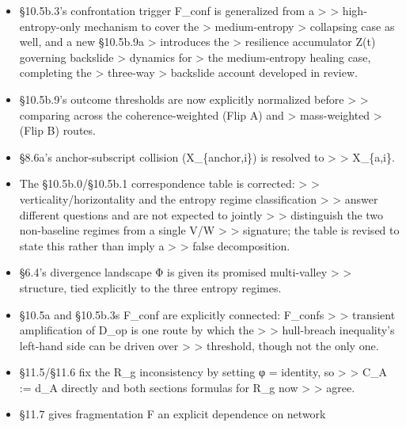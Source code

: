 \documentclass[
]{article}
\begin{document}
\begin{itemize}
  contradicting \textgreater{} \textgreater{} §10.5b.8's explicit
  coherence/dissipation account for that same \textgreater{}
  \textgreater{} regime. It now uses the coherence account consistently.
\item
  §10.5b.3's confrontation trigger F\_conf is generalized from a
  \textgreater{} \textgreater{} high-entropy-only mechanism to cover the
  \textgreater{} medium-entropy \textgreater{} collapsing case as well,
  and a new §10.5b.9a \textgreater{} introduces the \textgreater{}
  resilience accumulator Z(t) governing backslide \textgreater{}
  dynamics for \textgreater{} the medium-entropy healing case,
  completing the \textgreater{} three-way \textgreater{} backslide
  account developed in review.
\item
  §10.5b.9's outcome thresholds are now explicitly normalized before
  \textgreater{} \textgreater{} comparing across the coherence-weighted
  (Flip A) and \textgreater{} mass-weighted \textgreater{} (Flip B)
  routes.
\item
  §8.6a's anchor-subscript collision (X\_\{anchor,i\}) is resolved to
  \textgreater{} \textgreater{} X\_\{a,i\}.
\item
  The §10.5b.0/§10.5b.1 correspondence table is corrected:
  \textgreater{} \textgreater{} verticality/horizontality and the
  entropy regime classification \textgreater{} \textgreater{} answer
  different questions and are not expected to jointly \textgreater{}
  \textgreater{} distinguish the two non-baseline regimes from a single
  V/W \textgreater{} \textgreater{} signature; the table is revised to
  state this rather than imply a \textgreater{} \textgreater{} false
  decomposition.
\item
  §6.4's divergence landscape Φ is given its promised multi-valley
  \textgreater{} \textgreater{} structure, tied explicitly to the three
  entropy regimes.
\item
  §10.5a and §10.5b.3s F\_conf are explicitly connected: F\_confs
  \textgreater{} \textgreater{} transient amplification of D\_op is one
  route by which the \textgreater{} \textgreater{} hull-breach
  inequality's left-hand side can be driven over \textgreater{}
  \textgreater{} threshold, though not the only one.
\item
  §11.5/§11.6 fix the R\_g inconsistency by setting φ = identity, so
  \textgreater{} \textgreater{} C\_A := d\_A directly and both sections
  formulas for R\_g now \textgreater{} \textgreater{} agree.
\item
  §11.7 gives fragmentation F an explicit dependence on network

\end{itemize}
\end{document}
